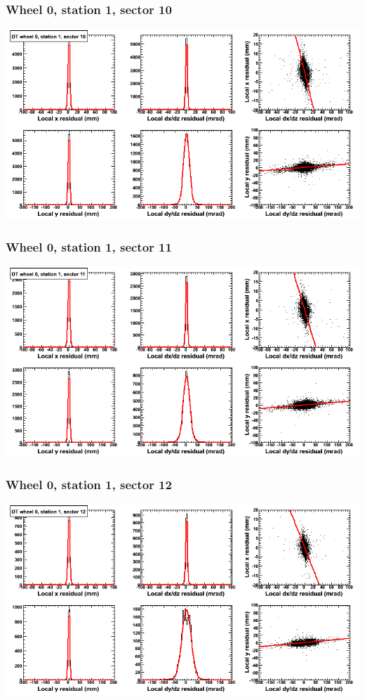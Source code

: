 \documentclass[compress]{beamer}
\begin{document}
\begin{frame}
\frametitle{Wheel 0, station 1, sector 10}
\includegraphics[width=\linewidth]{tmpbell_MBwhCst1sec10.png}
\end{frame}

\begin{frame}
\frametitle{Wheel 0, station 1, sector 11}
\includegraphics[width=\linewidth]{tmpbell_MBwhCst1sec11.png}
\end{frame}

\begin{frame}
\frametitle{Wheel 0, station 1, sector 12}
\includegraphics[width=\linewidth]{tmpbell_MBwhCst1sec12.png}
\end{frame}
\end{document}
